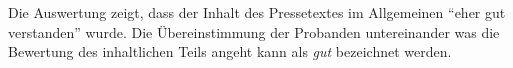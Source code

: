 Die Auswertung zeigt, dass der Inhalt des Pressetextes im Allgemeinen
\enquote{eher gut verstanden} wurde. Die Übereinstimmung der Probanden
untereinander was die Bewertung des inhaltlichen Teils angeht kann als
\emph{gut} bezeichnet werden.








